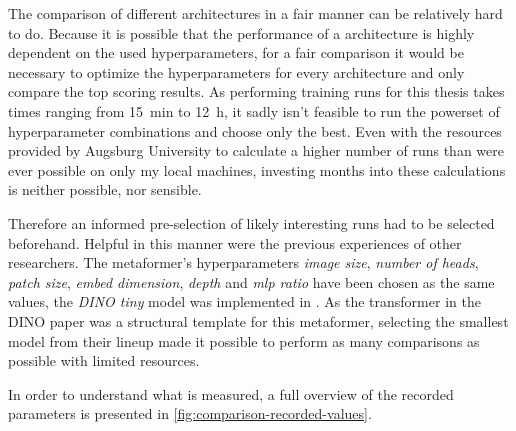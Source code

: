 


The comparison of different architectures in a fair manner can be relatively hard to do.
Because it is possible that the performance of a architecture is highly dependent on the used hyperparameters, for a fair comparison it would be necessary to optimize the hyperparameters for every architecture and only compare the top scoring results.
As performing training runs for this thesis takes times ranging from \SI[]{15}[]{\minute} to \SI[]{12}[]{\hour}, it sadly isn't feasible to run the powerset of hyperparameter combinations and choose only the best.
Even with the resources provided by Augsburg University to calculate a higher number of runs than were ever possible on only my local machines, investing months into these calculations is neither possible, nor sensible.

Therefore an informed pre-selection of likely interesting runs had to be selected beforehand.
Helpful in this manner were the previous experiences of other researchers. 
The metaformer's hyperparameters \emph{image size}, \emph{number of heads}, \emph{patch size}, \emph{embed dimension}, \emph{depth} and \emph{mlp ratio} have been chosen as the same values, the \emph{DINO tiny} model was implemented in \cite{dinoGithub}. As the transformer in the DINO paper \cite{dinoPaper} was a structural template for this metaformer, selecting the smallest model from their lineup made it possible to perform as many comparisons as possible with limited resources.

In order to understand what is measured, a full overview of the recorded parameters is presented in \autoref{fig:comparison-recorded-values}.

